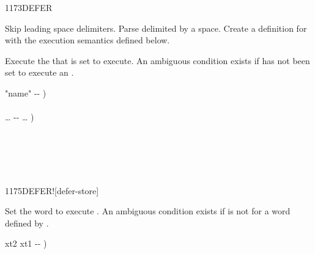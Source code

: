 \vspace*{-.5ex}
\begin{worddef}{1173}{DEFER}%
\item {}

	Skip leading space delimiters.  Parse  delimited by a
	space.  Create a definition for  with the execution
	semantics defined below.

\execute[name]

	Execute the  that  is set to execute.
	An ambiguous condition exists if  has not been
	set to execute an .


	\begin{implement} %
		\word{:}   "name" -{}- ) \\
		\tab {} \word{[']}  \word{,} \\
		  {\ldots} -{}- {\ldots} ) \\
		\tab {}  \word{;}
	\end{implement}

	\begin{testing} %
		 \\
		 \\

		 \\
	\end{testing}
\end{worddef}

\vspace*{-.5ex}
\begin{worddef}{1175}{DEFER!}[defer-store]%
\item {}

	Set the word  to execute .  An ambiguous
	condition exists if  is not for a word defined by
	.


	\begin{implement} %
		\word{:}   xt2 xt1 -{}- ) \\
		\tab {} \word{!} \word{;}
	\end{implement}

	\begin{testing} %

		 \\

		 \\
	\end{testing}
\end{worddef}


